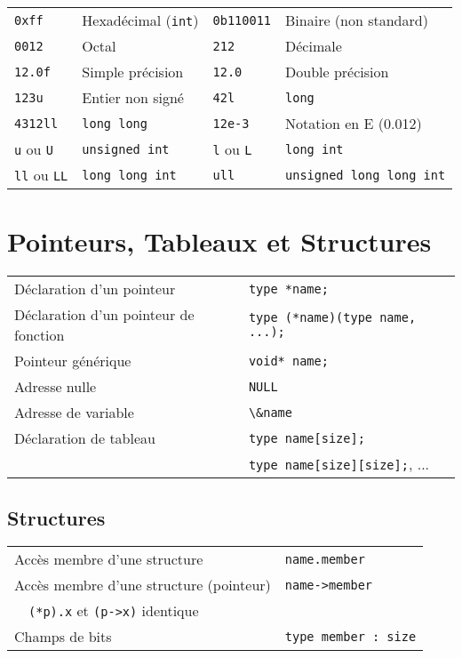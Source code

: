 \documentclass{article}
\newcommand{\cd}{\lstinline}
\begin{document}
\begin{multicols*}{3}
\begin{tabularx}{\linewidth}{
  >{\hsize=0.5\hsize}X%
  >{\hsize=1.5\hsize}X%
  >{\hsize=0.5\hsize}X%
  >{\hsize=1.5\hsize}X%
  }

  \cd{0xff}    & Hexadécimal (\texttt{int}) & \cd{0b110011}    & Binaire (non standard) \\
  \cd{0012}    & Octal & \cd{212}    & Décimale \\
  \cd{12.0f}   & Simple précision & \cd{12.0}    & Double précision \\
  \cd{123u}    & Entier non signé       & \cd{42l}     & \cd{long} \\
  \cd{4312ll}  & \cd{long long} & \cd{12e-3} & Notation en E (0.012) \\ \hline
  \cd{u} ou \cd{U}  & \cd{unsigned int} & \cd{l} ou \cd{L} & \cd{long int} \\
  \cd{ll} ou \cd{LL}  & \cd{long long int} & \cd{ull} & \cd{unsigned long long int} \\
\end{tabularx}

\section*{Pointeurs, Tableaux et Structures}
\begin{tabularx}{\linewidth}{Xl}
  Déclaration d'un pointeur & \cd{type *name;} \\
  Déclaration d'un pointeur de fonction & \cd{type (*name)(type name, ...);} \\
  Pointeur générique & \cd{void* name;} \\
  Adresse nulle & \cd{NULL} \\
  Adresse de variable & \cd{\&name} \\
  Déclaration de tableau & \cd{type name[size];} \\
                         & \cd{type name[size][size];}, ... \\
\end{tabularx}

\subsection*{Structures}
\begin{tabularx}{\linewidth}{Xl}
  Accès membre d'une structure & \cd{name.member} \\
  Accès membre d'une structure (pointeur) & \cd{name->member} \\
  \ \ \cd{(*p).x} et \cd{(p->x)} identique & \\
  Champs de bits & \cd{type member : size} \\
\end{tabularx}


\end{multicols*}
\end{document}
